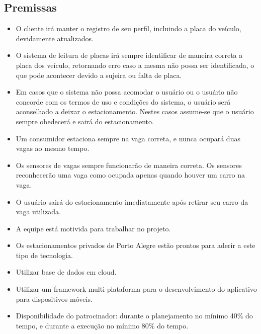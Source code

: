 


\subsection{Premissas}

\begin{itemize}
	\item O cliente irá manter o registro de seu perfil, incluindo a placa do veículo, devidamente atualizados.
    \item O sistema de leitura de placas irá sempre identificar de maneira correta a placa dos veículo, retornando erro caso a mesma não possa ser identificada, o que pode acontecer devido a sujeira ou falta de placa.
    \item Em casos que o sistema não possa acomodar o usuário ou o usuário não concorde com os termos de uso e condições do sistema, o usuário será aconselhado a deixar o estacionamento. Nestes casos assume-se que o usuário sempre obedecerá e sairá do estacionamento.
    \item Um consumidor estaciona sempre na vaga correta, e nunca ocupará duas vagas ao mesmo tempo.
    \item Os sensores de vagas sempre funcionarão de maneira correta. Os sensores reconhecerão uma vaga como ocupada apenas quando houver um carro na vaga.
    \item O usuário sairá do estacionamento imediatamente após retirar seu carro da vaga utilizada.
    \item A equipe está motivida para trabalhar no projeto.
	\item Os estacionamentos privados de Porto Alegre estão prontos para aderir a este tipo de tecnologia.
	\item Utilizar base de dados em cloud.
	\item Utilizar um framework multi-plataforma para o desenvolvimento do aplicativo para dispositivos móveis.
	\item Disponibilidade do patrocinador: durante o planejamento no mínimo 40\% do tempo, e durante a execução no mínimo 80\% do tempo.
\end{itemize}


